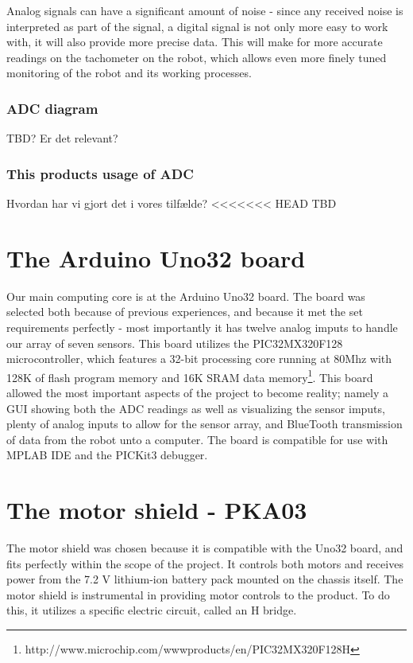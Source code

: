 Analog signals can have a significant amount of noise - since any received noise is interpreted as part of the signal, a digital signal is not only more easy to work with, it will also provide more precise data. This will make for more accurate readings on the tachometer on the robot, which allows even more finely tuned monitoring of the robot and its working processes. \\

\subsubsection{ADC diagram} 
TBD? Er det relevant?

\subsubsection{This products usage of ADC}
Hvordan har vi gjort det i vores tilfælde?
<<<<<<< HEAD
TBD

\section{The Arduino Uno32 board}

Our main computing core is at the Arduino Uno32 board. The board was selected both because of previous experiences, and because it met the set requirements perfectly - most importantly it has twelve analog imputs to handle our array of seven sensors. This board utilizes the PIC32MX320F128 microcontroller, which features a 32-bit processing core running at 80Mhz with 128K of flash program memory and 16K SRAM data memory\footnote{http://www.microchip.com/wwwproducts/en/PIC32MX320F128H}. This board allowed the most important aspects of the project to become reality; namely a GUI showing both the ADC readings as well as visualizing the sensor imputs, plenty of analog inputs to allow for the sensor array, and BlueTooth transmission of data from the robot unto a computer.\newline
The board is compatible for use with MPLAB IDE and the PICKit3 debugger.

\section{The motor shield - PKA03}

The motor shield was chosen because it is compatible with the Uno32 board, and fits perfectly within the scope of the project. It controls both motors and receives power from the 7.2 V lithium-ion battery pack mounted on the chassis itself. The motor shield is instrumental in providing motor controls to the product. To do this, it utilizes a specific electric circuit, called an H bridge.

